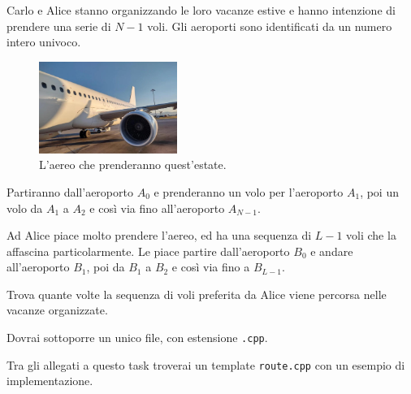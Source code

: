 \usepackage{xcolor}
\usepackage{afterpage}
\usepackage{pifont,mdframed}
\usepackage[bottom]{footmisc}
\usepackage{minted}

\newcommand{\inputfile}{\texttt{stdin}}
\newcommand{\outputfile}{\texttt{stdout}}
\makeatletter
\renewcommand{\this@inputfilename}{\texttt{stdin}}
\renewcommand{\this@outputfilename}{\texttt{stdout}}
\renewcommand{\this@syllabuslevel}{5}
\renewcommand{\this@custdifficulty}{3}
\makeatother
{}

Carlo e Alice stanno organizzando le loro vacanze estive e hanno intenzione di prendere una serie di $N-1$ voli.
Gli aeroporti sono identificati da un numero intero univoco.

\begin{figure}[h]
    \centering
    \includegraphics[width=0.4\textwidth]{./plane.png}
    \caption{L'aereo che prenderanno quest'estate.}
\end{figure}

Partiranno dall'aeroporto $A_0$ e prenderanno un volo per l'aeroporto $A_1$, poi un volo da $A_1$ a $A_2$ e così
via fino all'aeroporto $A_{N-1}$.

Ad Alice piace molto prendere l'aereo, ed ha una sequenza di $L-1$ voli che la affascina particolarmente.
Le piace partire dall'aeroporto $B_0$ e andare all'aeroporto $B_1$, poi da $B_1$ a $B_2$ e così via fino a $B_{L-1}$.

Trova quante volte la sequenza di voli preferita da Alice viene percorsa nelle vacanze organizzate.

\Implementation

Dovrai sottoporre un unico file, con estensione \texttt{.cpp}.

\begin{warning}
    Tra gli allegati a questo task troverai un template \texttt{route.cpp} con un esempio di implementazione.
\end{warning}

